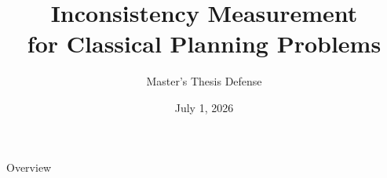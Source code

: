 \documentclass[aspectratio=169]{beamer} %
\title{Inconsistency Measurement \\for Classical Planning Problems}
\subtitle{Master's Thesis Defense}
\author[\authname]{\authorname}
\institute{Artificial Intelligence Group,\\
University of Hagen, Germany}
\date{July 1, 2026}
\begin{document}
\begin{frame}
    \titlepage
\end{frame}
\nologo

\begin{frame}{Overview}
    \tableofcontents
\end{frame}














\end{document}

